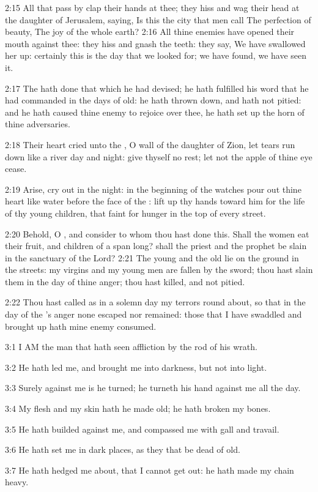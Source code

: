 2:15 All that pass by clap their hands at thee; they hiss and wag
their head at the daughter of Jerusalem, saying, Is this the city that
men call The perfection of beauty, The joy of the whole earth?  2:16
All thine enemies have opened their mouth against thee: they hiss and
gnash the teeth: they say, We have swallowed her up: certainly this is
the day that we looked for; we have found, we have seen it.

2:17 The \LORD hath done that which he had devised; he hath fulfilled
his word that he had commanded in the days of old: he hath thrown
down, and hath not pitied: and he hath caused thine enemy to rejoice
over thee, he hath set up the horn of thine adversaries.

2:18 Their heart cried unto the \LORD, O wall of the daughter of Zion,
let tears run down like a river day and night: give thyself no rest;
let not the apple of thine eye cease.

2:19 Arise, cry out in the night: in the beginning of the watches pour
out thine heart like water before the face of the \LORD: lift up thy
hands toward him for the life of thy young children, that faint for
hunger in the top of every street.

2:20 Behold, O \LORD, and consider to whom thou hast done this. Shall
the women eat their fruit, and children of a span long? shall the
priest and the prophet be slain in the sanctuary of the Lord?  2:21
The young and the old lie on the ground in the streets: my virgins and
my young men are fallen by the sword; thou hast slain them in the day
of thine anger; thou hast killed, and not pitied.

2:22 Thou hast called as in a solemn day my terrors round about, so
that in the day of the \LORD's anger none escaped nor remained: those
that I have swaddled and brought up hath mine enemy consumed.

3:1 I AM the man that hath seen affliction by the rod of his wrath.

3:2 He hath led me, and brought me into darkness, but not into light.

3:3 Surely against me is he turned; he turneth his hand against me all
the day.

3:4 My flesh and my skin hath he made old; he hath broken my bones.

3:5 He hath builded against me, and compassed me with gall and
travail.

3:6 He hath set me in dark places, as they that be dead of old.

3:7 He hath hedged me about, that I cannot get out: he hath made my
chain heavy.


